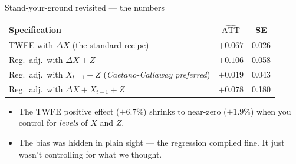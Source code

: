 \documentclass[aspectratio=169,11pt]{beamer}
\begin{document}
\begin{frame}{Stand-your-ground revisited --- the numbers}
\vspace{0.5em}
\begin{center}
\renewcommand{\arraystretch}{1.4}
\footnotesize
\begin{tabular}{@{}lcc@{}}
\toprule
\textbf{Specification}                                & \textbf{$\widehat{\text{ATT}}$} & \textbf{SE} \\
\midrule
TWFE with $\Delta X$ (the standard recipe)            & $+0.067$               & 0.026       \\
Reg.\ adj.\ with $\Delta X + Z$                        & $+0.106$               & 0.058       \\
\rowcolor{remixgreenlight}
Reg.\ adj.\ with $X_{t-1} + Z$ \;(\textit{Caetano-Callaway preferred}) & $+0.019$ & 0.043 \\
Reg.\ adj.\ with $\Delta X + X_{t-1} + Z$              & $+0.078$               & 0.180       \\
\bottomrule
\end{tabular}
\end{center}
\vspace{0.6em}
\begin{itemize}\small
  \item The TWFE positive effect ($+6.7\%$) shrinks to near-zero ($+1.9\%$) when you control for \textit{levels} of $X$ and $Z$.
  \item The bias was hidden in plain sight --- the regression compiled fine. It just wasn't controlling for what we thought.
\end{itemize}
\end{frame}

\end{document}
